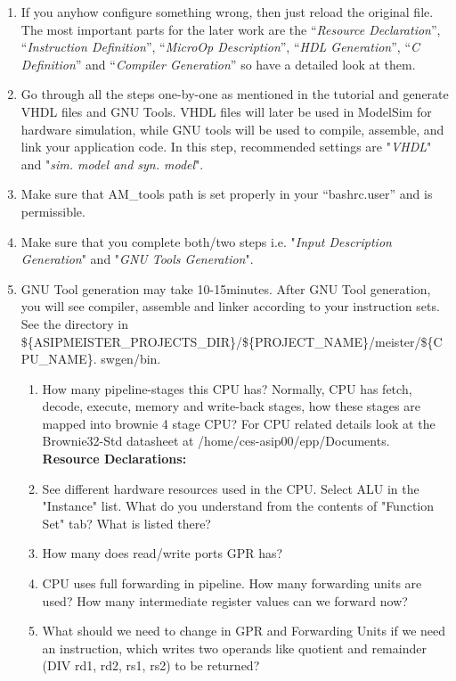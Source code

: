 \begin{enumerate}
\begin{enumerate}
	\item If you anyhow configure something wrong, then just reload the original file. The most important parts for the later work are the ``\emph{Resource Declaration}'', ``\emph{Instruction Definition}'', 	``\emph{MicroOp Description}'', ``\emph{HDL Generation}'', ``\emph{C Definition}'' and ``\emph{Compiler Generation}'' so have a detailed look at them.
	\item Go through all the steps one-by-one as mentioned in the tutorial and
	generate VHDL files and GNU Tools. VHDL files will later be used in ModelSim for hardware simulation, while GNU tools will be used to compile, assemble, and link your application code. In this step, recommended settings are "\emph{VHDL}" and "\emph{sim. model and syn. model}".
	\item Make sure that AM\_tools path is set properly in your ``bashrc.user'' and is permissible.
	\item Make sure that you complete both/two steps i.e. "\emph{Input Description Generation}" and "\emph{GNU Tools Generation}".
	\item GNU Tool generation may take 10-15minutes. After GNU Tool generation, you will see compiler, assemble and linker according to your instruction sets. See the directory in \$\{ASIPMEISTER\_PROJECTS\_DIR\}/\$\{PROJECT\_NAME\}/meister/\$\{CPU\_NAME\}.
	swgen/bin.
		\begin{enumerate}[label=(\alph*)]
		\color{red}\item\normalcolor How many pipeline-stages this CPU has? Normally, CPU has fetch, decode, execute, memory and write-back stages, how these stages are mapped into brownie 4 stage CPU? For CPU related details look at the Brownie32-Std datasheet at /home/ces-asip00/epp/Documents.
		\newline\textbf{Resource Declarations:}
		\color{red}\item\normalcolor  See different hardware resources used in the CPU. Select ALU in the "Instance" list. What do you understand from the contents of "Function Set" tab? What is listed there?
		\color{red}\item\normalcolor  How many does read/write ports GPR has?
		\color{red}\item\normalcolor  CPU uses full forwarding in pipeline. How many forwarding units are used? How many intermediate register values can we forward now?
		\color{red}\item\normalcolor  What should we need to change in GPR and Forwarding Units if we need an instruction, which writes two operands like quotient and remainder (DIV rd1, rd2, rs1, rs2) to be returned?

\end{enumerate}
\end{enumerate}
\end{enumerate}
